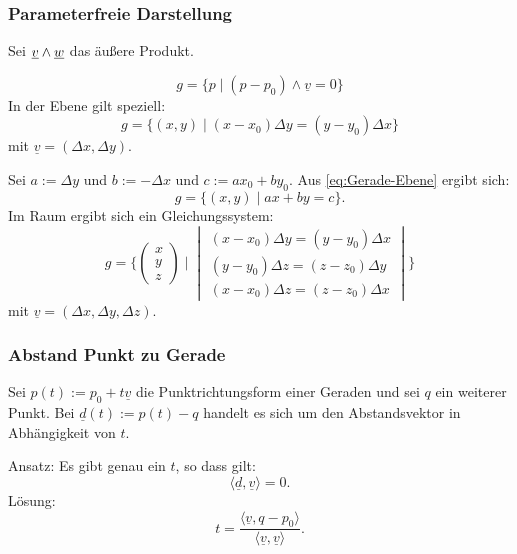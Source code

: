 \subsubsection{Parameterfreie Darstellung}
Sei $\underline{v}\wedge\underline{w}$ das äußere Produkt.

\begin{equation}
g = \{p\mid (p-p_0)\wedge \underline v=0\}
\end{equation}
In der Ebene gilt speziell:
\begin{equation}\label{eq:Gerade-Ebene}
g = \{(x,y)\mid (x-x_0)\Delta y = (y-y_0)\Delta x\}
\end{equation}
mit $\underline v=(\Delta x,\Delta y)$.

Sei $a:=\Delta y$ und $b:=-\Delta x$ und $c:=ax_0+by_0$.
Aus \eqref{eq:Gerade-Ebene} ergibt sich:
\begin{equation}
g = \{(x,y)\mid ax+by=c\}.
\end{equation}
Im Raum ergibt sich ein Gleichungssystem:
\begin{equation}
g = \{\begin{pmatrix}x\\ y\\ z\end{pmatrix}
\mid
\begin{vmatrix}
(x-x_0)\Delta y = (y-y_0)\Delta x\\
(y-y_0)\Delta z = (z-z_0)\Delta y\\
(x-x_0)\Delta z = (z-z_0)\Delta x
\end{vmatrix}\}
\end{equation}
mit $\underline v=(\Delta x,\Delta y,\Delta z)$.

\subsubsection{Abstand Punkt zu Gerade}
Sei $p(t):=p_0+t\underline v$ die Punktrichtungsform einer Geraden und
sei $q$ ein weiterer Punkt. Bei $\underline d(t):=p(t)-q$ handelt
es sich um den Abstandsvektor in Abhängigkeit von $t$.

Ansatz: Es gibt genau ein $t$, so dass gilt:
\begin{equation}
\langle\underline d,\underline v\rangle=0.
\end{equation}
Lösung:
\begin{equation}
t = \frac
  {\langle\underline v,q{-}p_0\rangle}
  {\langle\underline v,\underline v\rangle}.
\end{equation}

